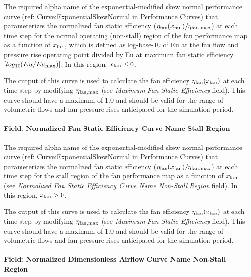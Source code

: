 The required alpha name of the exponential-modified skew normal performance curve (ref: Curve:ExponentialSkewNormal in Performance Curves) that parameterizes the normalized fan static efficiency (\(\eta_{\rm{fan}}(x_{\rm{fan}}) / \eta_{\rm{fan, max}}\)) at each time step for the normal operating (non-stall) region of the fan performance map as a function of \(x_{\rm{fan}}\), which is defined as log-base-10 of Eu at the fan flow and pressure rise operating point divided by Eu at maximum fan static efficiency \([log_{10}(Eu / Eu_{\rm{max}})]\). In this region, \(x_{\rm{fan}} \le 0\).

The output of this curve is used to calculate the fan efficiency \(\eta_{\rm{fan}} (x_{\rm{fan}})\) at each time step by modifying \(\eta_{\rm{fan, max}}\) (see \emph{Maximum Fan Static Efficiency} field). This curve should have a maximum of 1.0 and should be valid for the range of volumetric flows and fan pressure rises anticipated for the simulation period.

\paragraph{Field: Normalized Fan Static Efficiency Curve Name Stall Region}\label{field-normalized-fan-static-efficiency-curve-name-stall-region}

The required alpha name of the exponential-modified skew normal performance curve (ref: Curve:ExponentialSkewNormal in Performance Curves) that parameterizes the normalized fan static efficiency (\(\eta_{\rm{fan}} (x_{\rm{fan}}) / \eta_{\rm{fan, max}}\)) at each time step for the stall region of the fan performance map as a function of \(x_{\rm{fan}}\) (see \emph{Normalized Fan Static Efficiency Curve Name Non-Stall Region} field). In this region, \(x_{\rm{fan}} > 0\).

The output of this curve is used to calculate the fan efficiency \(\eta_{\rm{fan}} ( x_{\rm{fan}} )\) at each time step by modifying \(\eta_{\rm{fan, max}}\) (see \emph{Maximum Fan Static Efficiency} field). This curve should have a maximum of 1.0 and should be valid for the range of volumetric flows and fan pressure rises anticipated for the simulation period.

\paragraph{Field: Normalized Dimensionless Airflow Curve Name Non-Stall Region}\label{field-normalized-dimensionless-airflow-curve-name-non-stall-region}

